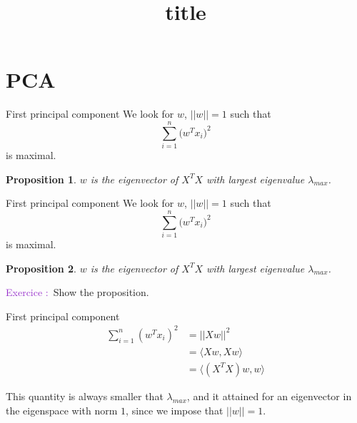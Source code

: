 \documentclass[usenames,dvipsnames]{beamer}
\title[FTML]{title}
\date{} %
\newtheorem*{proposition}{Proposition}
\newcounter{numexos}%
\newcommand{\exercice}[1]{%
\addtocounter{numexos}{1}%
\textcolor{DarkOrchid}{Exercice\,\thenumexos\,:}\,#1%
}
\begin{document}
\begin{frame}
\titlepage %
\end{frame}

\section{PCA}

\begin{frame}{First principal component}
    We look for $w$, $||w||=1$ such that
    \begin{equation}
	\sum^{n}_{i=1} \big(w^Tx_i \big)^2
    \end{equation}
     is maximal.
    \begin{proposition}
	$w$ is the eigenvector of $X^TX$ with largest eigenvalue $\lambda_{max}$.
    \end{proposition}
\end{frame}

\begin{frame}{First principal component}
    We look for $w$, $||w||=1$ such that
    \begin{equation}
	\sum^{n}_{i=1} \big(w^Tx_i \big)^2
    \end{equation}
     is maximal.
    \begin{proposition}
	\label{prop:pca}
	$w$ is the eigenvector of $X^TX$ with largest eigenvalue $\lambda_{max}$.
    \end{proposition}

    \exercice{\textbf{}} Show the proposition.
\end{frame}

\begin{frame}{First principal component}
        \begin{equation*}
        \begin{aligned}
	    \sum^{n}_{i=1} (w^Tx_i)^2 &= ||Xw||^2\\
	    &= \langle Xw, Xw \rangle\\
	    &= \langle (X^TX)w, w \rangle
        \end{aligned}
    \end{equation*}

    This quantity is always smaller that $\lambda_{max}$, and it attained for an eigenvector in the eigenspace with norm $1$, since we impose that $||w||=1$.

\end{frame}
\end{document}
